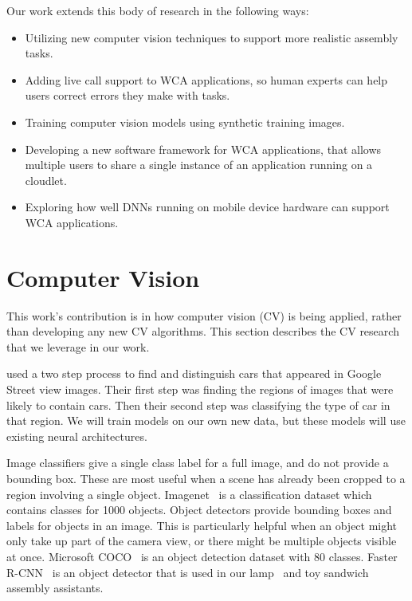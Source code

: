 Our work extends this body of research in the following ways:
\begin{itemize}
\item Utilizing new computer vision techniques to support more realistic
  assembly tasks.
\item Adding live call support to WCA applications, so human experts can help
  users correct errors they make with tasks.
\item Training computer vision models using synthetic training images.
\item Developing a new software framework for WCA applications, that allows
  multiple users to share a single instance of an application running on a
  cloudlet.
\item Exploring how well DNNs running on mobile device hardware can support
  WCA applications.
\end{itemize}

\section{Computer Vision}

This work's contribution is in how computer vision (CV) is being applied, rather
than developing any new CV algorithms.
This section describes the CV research that we leverage in our work.

\citet{gebru2017finegrained} used a two step process to find and distinguish
cars
that appeared in Google Street view images. Their first step was finding the
regions of images that were likely to contain cars. Then their second step was
classifying the type of car in that region. We will train models on our own new
data, but these models will use existing neural architectures.

Image classifiers give a single class label for a full image, and do not provide
a bounding box. These are most useful when a scene has already been cropped to a
region involving a single object. Imagenet~\cite{ImageNet_VSS09} is a
classification dataset which contains classes for 1000 objects. Object
detectors provide bounding boxes and labels for objects in an image. This is
particularly helpful
when an object might only take up part of the camera view, or there might be
multiple objects visible
at once. Microsoft COCO~\cite{coco} is an object detection dataset with 80
classes.
Faster R-CNN~\cite{frcnn} is an object detector that is used in our
lamp~\cite{lamp} and toy sandwich~\cite{sandwich} assembly assistants.

